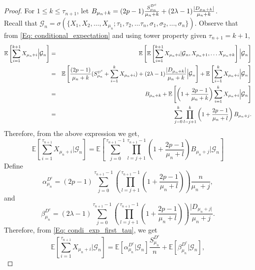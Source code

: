 \documentclass{article}
\numberwithin{equation}{section}
\newcommand{\GG}{\mbox{${\mathcal G}$}}
\newcommand{\sDD}{\tiny{\mbox{${\mathcal D}$}}}
\newcommand{\1}{\mathbf{1}}
\newcommand{\0}{\mathbf{0}}
\newcommand{\E}{\mbox{${\mathbb E}$}}
\begin{document}
\begin{proof}
    For $1 \leq k \le  \tau_{n+1}$, let $B_{\mu_n+k} = (2p-1) \frac{S_{\mu_n}^{\sDD^c}}{\mu_n+k} + (2\lambda-1) \frac{|D_{\mu_n+k}|}{\mu_n+k} $. \\
    Recall that $\GG_n = \sigma (\{X_1, X_2, \ldots, X_{\mu_n}; \tau_1, \tau_2, \ldots \tau_n, \sigma_1, \sigma_2, \ldots, \sigma_n\})$.
    Observe that from \eqref{Eq: conditional_expectation} and using tower property given $\tau_{n+1}=k+1$,
    \begin{eqnarray} 
    \label{eq:R_1}
\E\left[ \sum\limits_{i=1}^{k+1} X_{\mu_{n} + i} \Big \vert \GG_n \right]  &=& \E\left[ \E \left[\sum\limits_{i=1}^{k+1} X_{\mu_{n} + i} \vert \GG_{n}, X_{\mu_n+1},\dots X_{\mu_n+k} \right] \Big \vert \GG_{n} \right]\nonumber \\
&=& \E \left[ \frac{(2p-1)}{\mu_n+k}(S_{\mu_n}^{\sDD^c} + \sum\limits_{i=1}^{k} X_{\mu_{n} + i}) + (2\lambda-1) \frac{|D_{\mu_n+k}|}{\mu_n+k} \Big \vert \GG_{n} \right] + \E\left[ \sum\limits_{i=1}^{k} X_{\mu_{n} + i}  \Big \vert  \GG_{n} \right] \nonumber\\
     &=& B_{\mu_n+k} + \E\left[\left(1+\frac{2p-1}{\mu_n+k} \right) \sum\limits_{i=1}^{k} X_{\mu_{n} + i}  \Big \vert  \GG_{n} \right] \nonumber \\
    &=&  \sum_{j=0}^{k} \prod_{l=j+1}^{k} \left(1+\frac{2p-1}{\mu_n+l} \right) B_{\mu_n+j}.
\end{eqnarray}
Therefore, from the above expression we get, 
\begin{equation}
\label{Eq: condi_exp_first_tau}
\E\left[ \sum\limits_{i=1}^{\tau_{n+1}} X_{\mu_{n} + i} \Big \vert \GG_n \right]= \E\left[ \sum_{j=0}^{\tau_{n+1}-1} \prod_{l=j+1}^{\tau_{n+1}-1} \left(1+\frac{2p-1}{\mu_n+l} \right) B_{\mu_n+j}\Big \vert \GG_n \right]
\end{equation}
Define 
\begin{equation}
\label{Eq: Def_alpha_D_c}
\alpha_{\mu_n}^{D^c}= (2p-1) \sum_{j=0}^{\tau_{n+1}-1} \left(\prod_{l=j+1}^{\tau_{n+1}-1}\left(1+\frac{2p-1}{\mu_n+l}\right)\right)\frac{n}{\mu_n +j},
\end{equation} 
and
\begin{equation}
\label{Eq: Def_beta_D_c}
\beta_{\mu_n}^{D^c} =(2 \lambda -1)\sum_{j=0}^{\tau_{n+1}-1} \left(\prod_{l=j+1}^{\tau_{n+1}-1}\left(1+\frac{2p-1}{\mu_n+l}\right)\right)\frac{|D_{\mu_n +j|}}{\mu_n +j}.
\end{equation}
Therefore, from \eqref{Eq: condi_exp_first_tau}, we get 
\[
\E\left[ \sum\limits_{i=1}^{\tau_{n+1}} X_{\mu_{n} + i} \Big \vert \GG_n \right]= \E[\alpha_{\mu_n}^{D^c} \vert \GG_n]\frac{S_{\mu_n}^{D^c}}{n} + \E[\beta_{\mu_n}^{D^c} \vert \GG_n],
\]
\end{proof}
\end{document}
